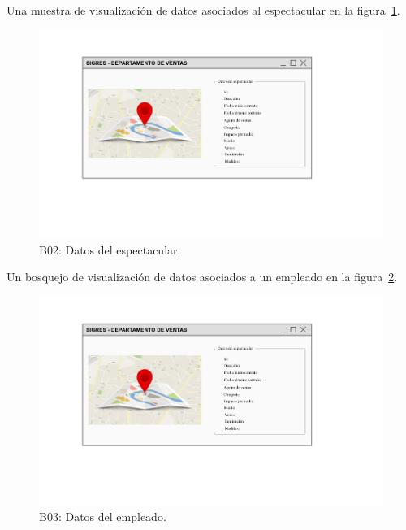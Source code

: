 Una muestra de visualización de datos asociados al espectacular en la figura~\ref{fig:b2}.
\begin{figure}[H]
    \centering
    \includegraphics[scale=.4]{iu/mockup2.png}
    \centering
    \caption{B02: Datos del espectacular.}
    \label{fig:b2}
\end{figure}

Un bosquejo de visualización de datos asociados a un empleado en la figura~\ref{fig:b3}.
\begin{figure}[H]
    \centering
    \includegraphics[scale=.4]{iu/mockup2.png}
    \centering
    \caption{B03: Datos del empleado.}
    \label{fig:b3}
\end{figure}

